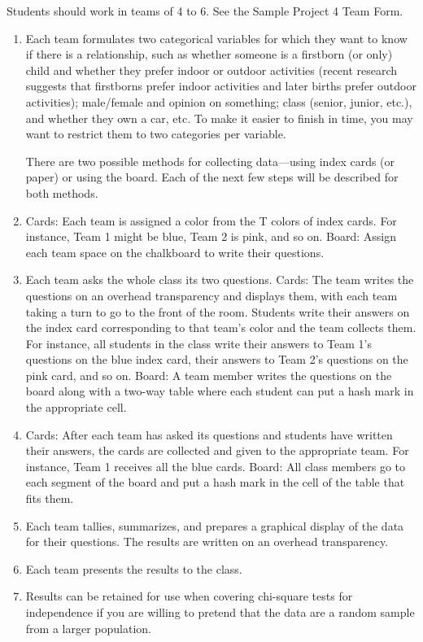 Students should work in teams of 4 to 6. See the Sample Project 4 Team Form.

\renewcommand{\labelenumi}{\textbf{Step \arabic{enumi}:}}
\begin{enumerate}[leftmargin=*, itemsep=1em]
\item Each team formulates two categorical variables for which they want to know if there is a relationship, such as whether someone is a firstborn (or only) child and whether they prefer indoor or outdoor activities (recent research suggests that firstborns prefer indoor activities and later births prefer outdoor activities); male/female and opinion on something; class (senior, junior, etc.), and whether they own a car, etc. To make it easier to finish in time, you may want to restrict them to two categories per variable.

There are two possible methods for collecting data---using index cards (or paper) or using the board. Each of the next few steps will be described for both methods.

\item Cards: Each team is assigned a color from the T colors of index cards. For instance, Team 1 might be blue, Team 2 is pink, and so on. Board: Assign each team space on the chalkboard to write their questions.

\item Each team asks the whole class its two questions. Cards: The team writes the questions on an overhead transparency and displays them, with each team taking a turn to go to the front of the room. Students write their answers on the index card corresponding to that team's color and the team collects them. For instance, all students in the class write their answers to Team 1's questions on the blue index card, their answers to Team 2's questions on the pink card, and so on. Board: A team member writes the questions on the board along with a two-way table where each student can put a hash mark in the appropriate cell. 

\item Cards: After each team has asked its questions and students have written their answers, the cards are collected and given to the appropriate team. For instance, Team 1 receives all the blue cards. Board: All class members go to each segment of the board and put a hash mark in the cell of the table that fits them.

\item Each team tallies, summarizes, and prepares a graphical display of the data for their questions. The results are written on an overhead transparency.

\item Each team presents the results to the class.

\item Results can be retained for use when covering chi-square tests for independence if you are willing to pretend that the data are a random sample from a larger population.
\end{enumerate}




